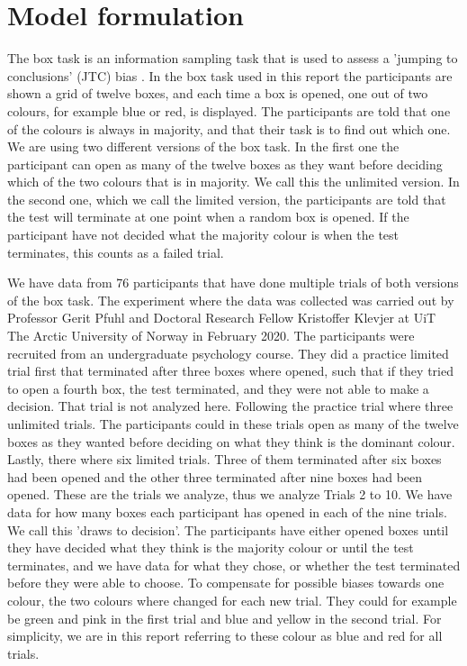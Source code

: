 \newpage
\chapter{Model formulation}
\label{Chapter_Problem_setup}
The box task is an information sampling task that is used to assess a 'jumping to conclusions' (JTC) bias \citep{balzan2017}. In the box task used in this report the participants are shown a grid of twelve boxes, and each time a box is opened, one out of two colours, for example blue or red, is displayed. The participants are told that one of the colours is always in majority, and that their task is to find out which one. We are using two different versions of the box task. In the first one the participant can open as many of the twelve boxes as they want before deciding which of the two colours that is in majority. We call this the unlimited version. In the second one, which we call the limited version, the participants are told that the test will terminate at one point when a random box is opened. If the participant have not decided what the majority colour is when the test terminates, this counts as a failed trial. 

We have data from 76 participants that have done multiple trials of both versions of the box task. The experiment where the data was collected was carried out by Professor Gerit Pfuhl and Doctoral Research Fellow Kristoffer Klevjer at UiT The Arctic University of Norway in February 2020. The participants were recruited from an undergraduate psychology course. They did a practice limited trial first that terminated after three boxes where opened, such that if they tried to open a fourth box, the test terminated, and they were not able to make a decision. That trial is not analyzed here. Following the practice trial where three unlimited trials. The participants could in these trials open as many of the twelve boxes as they wanted before deciding on what they think is the dominant colour. Lastly, there where six limited trials. Three of them terminated after six boxes had been opened and the other three terminated after nine boxes had been opened. These are the trials we analyze, thus we analyze Trials 2 to 10. We have data for how many boxes each participant has opened in each of the nine trials. We call this 'draws to decision'. The participants have either opened boxes until they have decided what they think is the majority colour or until the test terminates, and we have data for what they chose, or whether the test terminated before they were able to choose. To compensate for possible biases towards one colour, the two colours where changed for each new trial. They could for example be green and pink in the first trial and blue and yellow in the second trial. For simplicity, we are in this report referring to these colour as blue and red for all trials.

